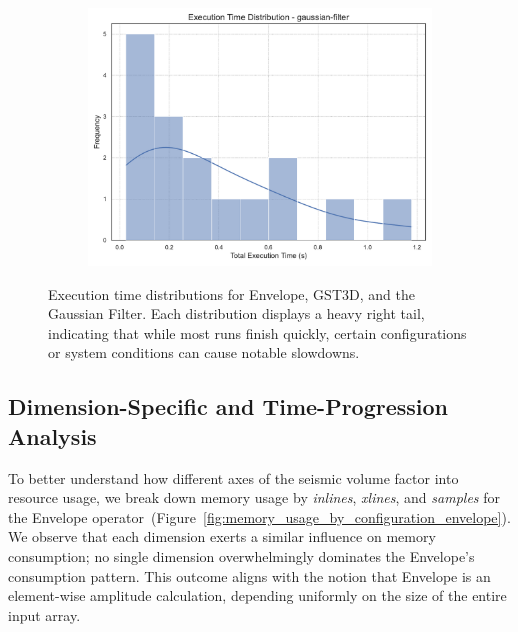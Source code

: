 \begin{figure}[htbp]
\begin{subfigure}[t]{0.49\textwidth}
        \includegraphics[width=\textwidth]{assets/images/05/execution_time_distribution_gaussian-filter}
    \end{subfigure}
    \caption{Execution time distributions for Envelope, \ac{GST3D}, and the Gaussian Filter. Each distribution displays a heavy right tail, indicating that while most runs finish quickly, certain configurations or system conditions can cause notable slowdowns.}
    \label{fig:execution_time_distribution_facet}
\end{figure}

\subsection{Dimension-Specific and Time-Progression Analysis}
\label{subsec:dimension-specific-and-time-progression-analysis}


To better understand how different axes of the seismic volume factor into resource usage, we break down memory usage by \emph{inlines}, \emph{xlines}, and \emph{samples} for the Envelope operator~(Figure~\ref{fig:memory_usage_by_configuration_envelope}).
We observe that each dimension exerts a similar influence on memory consumption; no single dimension overwhelmingly dominates the Envelope’s consumption pattern.
This outcome aligns with the notion that Envelope is an element-wise amplitude calculation, depending uniformly on the size of the entire input array.

